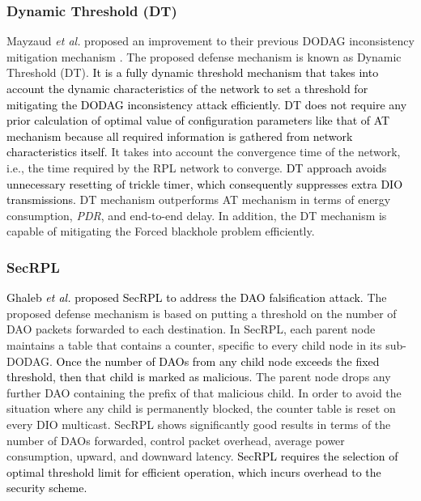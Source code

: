 \documentclass[10pt,journal,sort & compress]{IEEEtran}
\begin{document}
\subsubsection*{Dynamic Threshold (DT)}
Mayzaud \textit{et al.} \cite{Mayzaud2015} proposed an improvement to their previous DODAG inconsistency mitigation mechanism \cite{Sehgal2014}. The proposed defense mechanism is known as Dynamic Threshold (DT). \textcolor{black}{It is a fully dynamic threshold mechanism that takes into account the dynamic characteristics of the network to set a threshold for mitigating the DODAG inconsistency attack efficiently. DT does not require any prior calculation of optimal value of configuration parameters like that of AT mechanism because all required information is gathered from network characteristics itself.} It takes into account the convergence time of the network, i.e., the time required by the RPL network to converge. \textcolor{black}{DT approach avoids unnecessary resetting of trickle timer, which consequently suppresses extra DIO transmissions.} DT mechanism outperforms AT mechanism in terms of energy consumption, \textit{PDR}, and end-to-end delay. In addition, the DT mechanism is capable of mitigating the Forced blackhole problem efficiently.

\subsubsection*{SecRPL}
\textcolor{black}{Ghaleb \textit{et al.} \cite{AddressingDAO} proposed SecRPL to address the DAO falsification attack.} The proposed defense mechanism is based on putting a threshold on the number of DAO packets forwarded to each destination. In SecRPL, each parent node maintains a table that contains a counter, specific to every child node in its sub-DODAG. \textcolor{black}{Once the number of DAOs from any child node exceeds the fixed threshold, then that child is marked as malicious.} The parent node drops any further DAO containing the prefix of that malicious child. In order to avoid the situation where any child is permanently blocked, the counter table is reset on every DIO multicast. SecRPL shows significantly good results in terms of the number of DAOs forwarded, control packet overhead, average power consumption, upward, and downward latency. \textcolor{black}{SecRPL requires the selection of optimal threshold limit for efficient operation, which incurs overhead to the security scheme.}     
\end{document}

